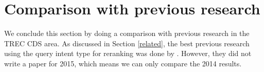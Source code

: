 % 
% 
% 

\section{Comparison with previous research}
We conclude this section by doing a comparison with previous research in the TREC CDS area. 
As discussed in Section \ref{related}, the best previous research using the query intent type for reranking
was done by \cite{choi}. However, they did not write a paper for 2015, which means we can only compare the 2014 results.

